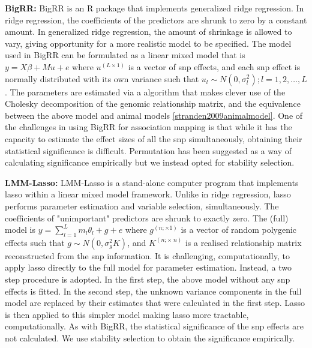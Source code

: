 \documentclass{nature}
\begin{document}
\textbf{BigRR:} BigRR \cite{shen2013novel}  is an R package that implements generalized ridge regression.
In ridge regression, the coefficients of the predictors are shrunk 
to zero by a constant amount.  In generalized ridge regression, the amount of shrinkage is allowed to vary, giving opportunity for 
a more realistic model to be specified. The model used in BigRR can be formulated as a linear mixed model that is 
$y = X \beta + M u + e$ where $u^{(L \times 1)}$ is a vector of snp effects, and each snp 
effect is normally distributed with its own variance such that $u_l \sim N(0, \sigma^2_l); l=1,2, \ldots, L$. 
The parameters are estimated via a 
algorithm that makes clever use of the Cholesky decomposition of the genomic relationship matrix, 
and the equivalence between the above model and animal models \ref{stranden2009animalmodel}. 
One of the challenges in using BigRR for association mapping is that while it has the capacity to estimate the effect sizes of all the snp simultaneously, 
obtaining their statistical significance is difficult. 
Permutation has been suggested as a way of calculating significance 
empirically \cite{shen2013novel} but we instead opted for stability selection.


\textbf{LMM-Lasso:} LMM-Lasso  \cite{rakitsch2013lasso} is a stand-alone computer program that implements lasso within a linear mixed model 
framework. Unlike in ridge regression, lasso performs parameter estimation and variable selection, simultaneously.   The 
coefficients of "unimportant" predictors are shrunk to exactly zero.
The (full) model is 
$y =  \sum_{l=1}^L m_l \theta_l +   g  + e$ where $g^{(n ; \times 1)}$ is a vector of random polygenic effects such that 
$g \sim N(0, \sigma^2_g K)$, and $K^{(n ; \times \; n)}$ is a realised relationship matrix reconstructed from the snp information. 
It is challenging, computationally,  to apply lasso directly to the full model for parameter estimation. Instead, a two step procedure 
is adopted. In the first step, the above model without any snp effects is fitted. In the second step, 
the unknown variance components in the full model are replaced by their estimates 
that were calculated in the first step. Lasso is then applied to this simpler model making lasso more tractable, computationally. 
As with BigRR,  the statistical significance of the snp effects are not calculated. We use stability selection to obtain the 
significance empirically. 
\end{document}
